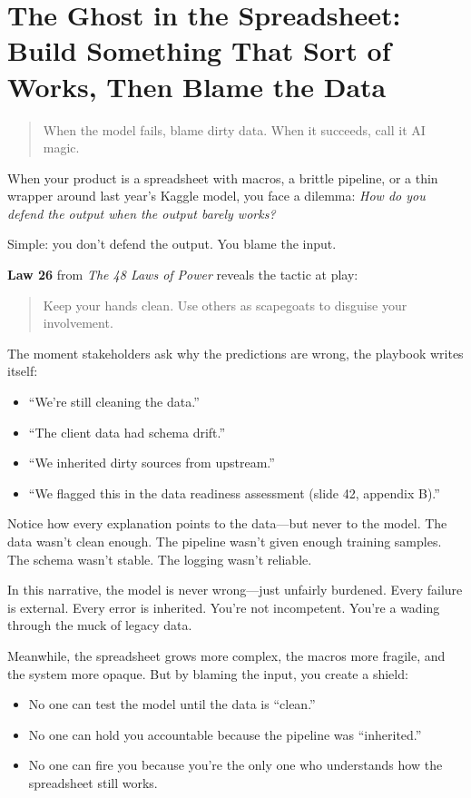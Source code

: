 \section{The Ghost in the Spreadsheet: Build Something That Sort of Works, Then Blame the Data}

\begin{quote}
When the model fails, blame dirty data. When it succeeds, call it AI magic.
\end{quote}

When your product is a spreadsheet with macros, a brittle pipeline, or a thin wrapper around last year’s Kaggle model, you face a dilemma:  
\textit{How do you defend the output when the output barely works?}

Simple: you don’t defend the output.  You blame the input.

\medskip

\textbf{Law 26} from \textit{The 48 Laws of Power} reveals the tactic at play:

\begin{quote}
  Keep your hands clean. Use others as scapegoats to disguise your involvement.
\end{quote}

The moment stakeholders ask why the predictions are wrong, the playbook writes itself:  
\begin{itemize}
  \item “We’re still cleaning the data.”
  \item “The client data had schema drift.”
  \item “We inherited dirty sources from upstream.”
  \item “We flagged this in the data readiness assessment (slide 42, appendix B).”
\end{itemize}

Notice how every explanation points to the data—but never to the model.  
The data wasn’t clean enough. The pipeline wasn’t given enough training samples. The schema wasn’t stable. The logging wasn’t reliable.

In this narrative, the model is never wrong—just unfairly burdened.  
Every failure is external. Every error is inherited.  
You’re not incompetent. You’re a wading through the muck of legacy data.

\medskip

Meanwhile, the spreadsheet grows more complex, the macros more fragile, and the system more opaque. But by blaming the input, you create a shield:  
\begin{itemize}
  \item No one can test the model until the data is “clean.”  
  \item No one can hold you accountable because the pipeline was “inherited.”   
  \item No one can fire you because you’re the only one who understands how the spreadsheet still works.
\end{itemize}

